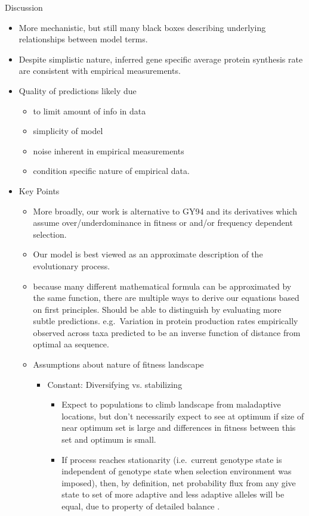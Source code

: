 \documentclass[12pt,letterpaper]{article}
\renewcommand{\subsection}[1]{%
\bigskip
\begin{center}
\begin{large}
\normalfont\itshape #1
\end{large}
\end{center}}
\begin{document}
\subsection*{Discussion}
\begin{itemize}
\item More mechanistic, but still many black boxes describing underlying relationships between model terms.
\item Despite simplistic nature, inferred gene specific average protein synthesis rate are consistent with empirical measurements.
\item Quality of predictions likely due
  \begin{itemize}
  \item to limit amount of info in data
  \item simplicity of model
  \item noise inherent in empirical measurements
  \item condition specific nature of empirical data.
  \end{itemize}
\item Key Points
  \begin{itemize}
  \item More broadly, our work is alternative to GY94 and its derivatives which assume  over/underdominance in fitness or  and/or frequency dependent selection.
  \item Our model is best viewed as an approximate description of the evolutionary process.
  \item because many different mathematical formula can be approximated by the same function, there are multiple ways to derive our equations based on first principles.
    Should be able to distinguish by evaluating  more subtle predictions.
    e.g.~Variation in protein production rates empirically observed across taxa predicted to be an inverse function of distance from optimal aa sequence.
  \item Assumptions about nature of fitness landscape
    \begin{itemize}
    \item Constant: Diversifying vs. stabilizing
      \begin{itemize}
      \item Expect to populations to climb landscape from maladaptive locations, but don't necessarily expect to see at optimum if size of near optimum set is large and differences in fitness between this set and optimum is small.
      \item If process reaches stationarity (i.e.~current genotype state is independent of genotype state when selection environment was imposed), then, by definition, net probability flux from any give state to set of more adaptive and less adaptive alleles will be equal, due to property of detailed balance \citep{Iwasa1988,SellaAndHirsh2005}.

\end{itemize}
\end{itemize}
\end{itemize}
\end{itemize}
\end{document}
